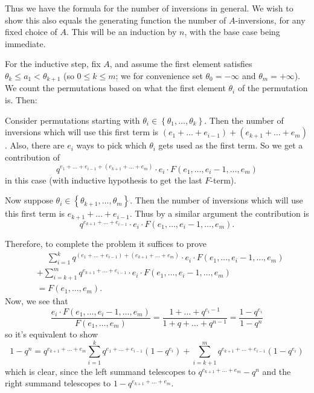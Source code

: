 \documentclass[11pt]{scrartcl}
\begin{document}
Thus we have the formula for the number of inversions in general.
We wish to show this also equals the generating function
the number of $A$-inversions, for any fixed choice of $A$.
This will be an induction by $n$, with the base case being immediate.

For the inductive step, fix $A$,
and assume the first element satisfies
$\theta_k \le a_1 < \theta_{k+1}$ (so $0 \le k \le m$;
we for convenience set $\theta_0 = -\infty$ and $\theta_m = +\infty$).
We count the permutations based on what the first element
$\theta_i$ of the permutation is.
Then:
\begin{itemize}
  \ii Consider permutations starting with
  $\theta_i \in \left\{ \theta_1, \dots, \theta_k \right\}$.
  Then the number of inversions which will
  use this first term is $(e_1 + \dots + e_{i-1})
  + (e_{k+1} + \dots + e_m)$.
  Also, there are $e_i$ ways to pick which
  $\theta_i$ gets used as the first term.
  So we get a contribution of
  \[ q^{e_1 + \dots + e_{i-1} + (e_{k+1} + \dots + e_m)}
    \cdot e_i \cdot F(e_1, \dots, e_i-1, \dots, e_m) \]
  in this case
  (with inductive hypothesis to get the last $F$-term).

  \ii Now suppose $\theta_i \in \left\{ \theta_{k+1}, \dots, \theta_m \right\}$.
  Then the number of inversions which will
  use this first term is $e_{k+1} + \dots + e_{i-1}$.
  Thus by a similar argument the contribution is
  \[ q^{e_{k+1} + \dots + e_{i-1}}
    \cdot e_i \cdot F(e_1, \dots, e_i-1, \dots, e_m). \]
\end{itemize}
Therefore, to complete the problem it suffices to prove
\begin{align*}
  &\phantom+ \sum_{i=1}^k q^{(e_1 + \dots + e_{i-1}) + (e_{k+1} + \dots + e_m)}
    \cdot e_i \cdot F(e_1, \dots, e_i-1, \dots, e_m) \\
  &+ \sum_{i=k+1}^m q^{e_{k+1} + \dots + e_{i-1}}
    \cdot e_i \cdot F(e_1, \dots, e_i-1, \dots, e_m) \\
  &= F(e_1, \dots, e_m).
\end{align*}
Now, we see that
\[ \frac{e_i \cdot F(e_1, \dots, e_i-1, \dots, e_m)}{F(e_1, \dots, e_m)}
  = \frac{1+\dots+q^{e_i-1}}{1+q+\dots+q^{n-1}}
  = \frac{1-q^{e_i}}{1-q^n} \]
so it's equivalent to show
\[ 1-q^n
  = q^{e_{k+1} + \dots + e_m} \sum_{i=1}^k q^{e_1 + \dots + e_{i-1}}(1-q^{e_i})
  + \sum_{i=k+1}^m q^{e_{k+1} + \dots + e_{i-1}} (1-q^{e_i})
\]
which is clear,
since the left summand telescopes to
$q^{e_{k+1}+\dots+e_m} - q^n$
and the right summand telescopes to
$1 - q^{e_{k+1}+\dots+e_m}$.
\end{document}
